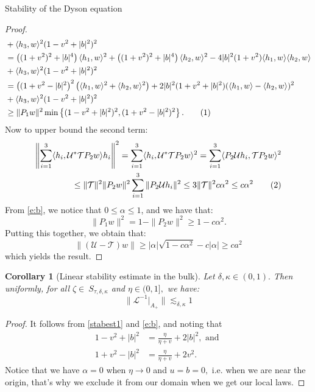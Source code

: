 \documentclass[11pt, a4paper, oneside]{book}
\numberwithin{equation}{chapter}
\newcommand{\TT}{\mathcal{T}}
\newcommand{\UU}{\mathcal{U}}
\newcommand{\beq}{\begin{equation}}
\newcommand{\eeq}{\end{equation}}
\newcommand\numberthis{\addtocounter{equation}{1}\tag{\theequation}}
\newtheorem{cor}[thm]{Corollary}
\begin{document}
\begin{section}{Stability of the Dyson equation}
\begin{proof}
\begin{align*}
&+ \langle h_3, w \rangle^2(1 - v^2 + |b|^2)^2 \\
&= \left ((1+v^2)^2+|b|^4 \right )\langle h_1, w \rangle^2 + \left ((1+v^2)^2+|b|^4 \right )\langle h_2, w \rangle^2 - 4 |b|^2 (1+v^2)\langle h_1, w \rangle\langle h_2, w \rangle \\
&+ \langle h_3, w \rangle^2(1 - v^2 +|b|^2)^2 \\
&= \left ((1+v^2-|b|^2 \right )^2 \left (\langle h_1, w\rangle^2 + \langle h_2, w \rangle^2 \right ) + 2|b|^2(1+v^2+ |b|^2)(\langle h_1, w\rangle-\langle h_2, w\rangle)^2 \\
&+ \langle h_3, w \rangle^2(1 - v^2+ |b|^2)^2 \\
&\geq \|P_1w\|^2 \min \left \{(1 - v^2+|b|^2)^2, (1+v^2-|b|^2)^2 \right \} . \numberthis
\end{align*}
%
Now to upper bound the second term:
\begin{align*}
\left \|\sum_{i=1}^3 \langle h_i, \UU^* \TT P_2 w\rangle h_i \right \|^2 = \sum_{i=1}^3 \langle h_i, \UU^* \TT P_2 w\rangle^2 = \sum_{i=1}^3 \langle P_2 \UU h_i, \TT P_2 w\rangle^2
\\
\leq \|\TT\|^2 \|P_2w\|^2 \sum_{i=1}^3 \|P_2 \UU h_i\|^2 
\leq
3\|\TT\|^2 c\alpha^2 \leq c \alpha^2 \numberthis
\end{align*}
%
From \eqref{e:b}, we notice that $0\leq \alpha \leq 1 $, and we have that:
%
\begin{equation} \label{e:bdP1w}
\|P_1 w\|^2 = 1 - \|P_2 w\|^2 \geq  1 - c\alpha^2 .
\end{equation}
Putting this together, we obtain that:
%
\begin{equation}
\| (\UU - \TT)w\| \geq |\alpha|\sqrt{1-c\alpha^2} - c|\alpha| \geq ca^2
\end{equation}
which yields the result.
\end{proof}

\begin{cor}[Linear stability estimate in the bulk] \label{stab-est2} Let $\delta, \kappa \in (0,1).$ Then uniformly, for all $\zeta \in \ S_{\tau,\delta,\kappa}$ and $\eta \in (0,1] ,$ we have:
%
\beq \label{stabest2}
\| \mathscr{L}^{-1} |_{A_+} \| \lesssim_{\delta, \kappa} 1
\eeq
%
\end{cor}
%
\begin{proof}
It follows from \eqref{stabest1} and \eqref{e:b}, and noting that 
\begin{align*}
1 - v^2 + |b|^2 &= \frac{\eta}{\eta + v} + 2|b|^2, \text{ and } \\
1 + v^2 - |b|^2 &= \frac{\eta}{\eta + v} + 2v^2.
\end{align*}
Notice that we have $\alpha = 0$ when $\eta \to 0$ and $u=b=0,$ i.e. when we are near the origin, that's why we exclude it from our domain when we get our local laws.
\end{proof}
\end{section}
\end{document}
